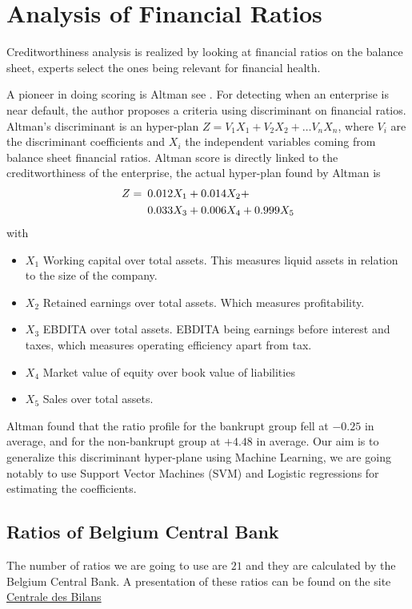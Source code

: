 \documentclass[DIV=calc, paper=a4, fontsize=11pt, twocolumn]{scrartcl}
\begin{document}
\section{Analysis of Financial Ratios}
Creditworthiness analysis is realized by looking at financial ratios on the balance sheet, experts select the ones being relevant 
for financial health.

A pioneer in doing scoring is Altman see  \cite{Altman}. For detecting when an enterprise is near default,
the author proposes a criteria using discriminant on financial ratios. 
Altman's discriminant is an hyper-plan $Z = V_1X_1 + V_2X_2 + \ldots V_nX_n$, where $V_i$ are the discriminant coefficients
and $X_i$ the independent variables coming from balance sheet financial ratios. 
Altman score is directly linked to the creditworthiness of the enterprise, the actual hyper-plan found by Altman is
\begin{align*}
Z =& \enskip 0.012X_1  + 0.014X_2 + \\
  & \enskip 0.033X_3 +   0.006X_4 +  0.999X_5\\
\end{align*}
with 
\begin{itemize}
  \item[] $X_1$ Working capital over total assets. This measures liquid assets in relation to the size of the company.
  \item[] $X_2$ Retained earnings over total assets. Which measures profitability. 
  \item[] $X_3$ EBDITA over total assets. EBDITA being earnings before interest and taxes, which measures operating efficiency apart from tax.
  \item[] $X_4$ Market value of equity over book value of liabilities
  \item[] $X_5$ Sales over total assets.
\end{itemize}
Altman found that the ratio profile for the bankrupt group fell at $-0.25$ in average, and for the non-bankrupt
 group at $+4.48$ in average.
Our aim is to generalize this discriminant hyper-plane using Machine Learning, we are going notably to use Support Vector Machines (SVM) 
and Logistic regressions for estimating the coefficients.

\subsection{Ratios of Belgium Central Bank}
The number of ratios we are going to use are $21$ and they are calculated by the Belgium Central Bank. A presentation of these ratios can be 
found on the site \href{https://www.nbb.be/fr/centrale-des-bilans}{Centrale des Bilans}
\end{document}
